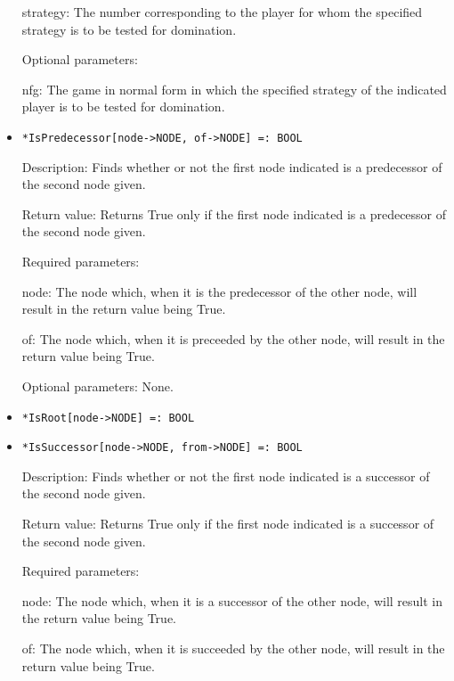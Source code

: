 \begin{itemize}
\bd
\item
[strategy:] The number corresponding to the player for whom the specified
strategy is to be tested for domination.
\ed

\item
[Optional parameters:] \hfil\null
\bd
\item
[nfg:] The game in normal form in which the specified strategy of the
indicated player is to be tested for domination.
\ed
\ed

\item
\protect \large \begin{verbatim}
*IsPredecessor[node->NODE, of->NODE] =: BOOL
\end{verbatim}\normalsize

\bd
\item
[Description:] Finds whether or not the first node indicated is a
predecessor of the second node given.
\item
[Return value:] Returns True only if the first node indicated is a
predecessor of the second node given.
\item
[Required parameters:]\hfil\null

\bd
\item
[node:] The node which, when it is the predecessor of the other node,
will result in the return value being True.
\item
[of:] The node which, when it is preceeded by the other node, will
result in the return value being True.
\ed

\item
[Optional parameters:] None.
\ed

\item
\protect \large \begin{verbatim}
*IsRoot[node->NODE] =: BOOL
\end{verbatim}\normalsize

\item
\protect \large \begin{verbatim}
*IsSuccessor[node->NODE, from->NODE] =: BOOL
\end{verbatim}\normalsize
\bd
\item
[Description:] Finds whether or not the first node indicated is a
successor of the second node given.
\item
[Return value:] Returns True only if the first node indicated is a
successor of the second node given.
\item
[Required parameters:]\hfil\null
	
\bd
\item
[node:] The node which, when it is a successor of the other node, will
result in the return value being True.
\item
[of:] The node which, when it is succeeded by the other node, will
result in the return value being True.
\ed


\end{itemize}
